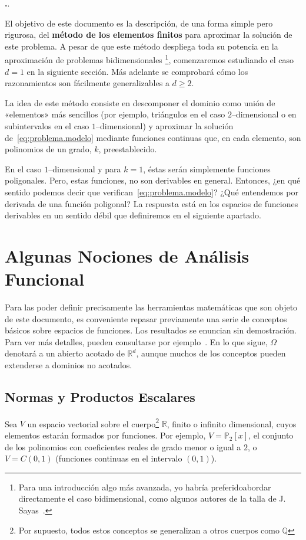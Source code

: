 \documentclass[11pt]{article}
\theoremstyle{plain}
\theoremstyle{definition}
\newcounter{stepnum}[section]
\newcommand{\step}{\bigskip\noindent\textbf{\thesection.\refstepcounter{stepnum}\thestepnum}.\enspace}
\newcommand{\Q}{\ensuremath{\mathbb{Q}}}
\newcommand{\R}{\ensuremath{\mathbb{R}}}
\renewcommand{\P}{\ensuremath{\mathbb{P}}}
\begin{document}
\step

El objetivo de este documento es la descripción,  de una forma simple pero rigurosa, del \textbf{método de los elementos finitos} para aproximar la solución de este problema. 
A pesar de que este método despliega toda su potencia en la aproximación de problemas bidimensionales%
\footnote{Para una introducción algo más avanzada, yo habría preferidoabordar directamente el caso bidimensional, como algunos autores de la talla de J. Sayas~\cite{sayas2008gentle}.}, %
comenzaremos estudiando el caso $d=1$ en la siguiente sección. Más adelante se comprobará cómo los razonamientos son fácilmente generalizables  a $d\geq 2$.

La idea de este método consiste en descomponer el dominio como unión de «elementos» más sencillos (por ejemplo, triángulos en el caso $2$--dimensional o en subintervalos en el caso $1$--dimensional) y aproximar la solución de~\eqref{eq:problema.modelo} mediante funciones continuas que, en cada elemento, son polinomios de un grado, $k$, preestablecido. 

En el caso $1$--dimensional y para $k=1$, éstas serán simplemente funciones poligonales. Pero, estas funciones, no son derivables en general. Entonces, ¿en qué sentido podemos decir que verifican~\eqref{eq:problema.modelo}? ¿Qué entendemos por derivada de una función poligonal? La respuesta está en los espacios de funciones derivables en un sentido débil que definiremos en el siguiente apartado.

\section{Algunas Nociones de Análisis Funcional}
\label{sec:análisis.funcional}

Para las poder definir precisamente las herramientas matemáticas que son objeto de este documento, es conveniente repasar previamente una serie de conceptos básicos sobre espacios de funciones. Los resultados se enuncian sin demostración. Para ver más detalles, pueden consultarse por ejemplo~\cite{adams2003sobolev, sayas2019variational}. En lo que sigue, $\Omega$ denotará a un abierto acotado de $\R^d$, aunque muchos de los conceptos pueden extenderse a dominios no acotados.

\subsection*{Normas y Productos Escalares}
Sea $V$ un espacio vectorial sobre el cuerpo\footnote{Por supuesto, todos estos conceptos se generalizan a otros cuerpos como $\Q$} $\R$, finito o infinito dimensional, cuyos elementos estarán formados por funciones. Por ejemplo, $V=\P_2[x]$, el conjunto de los polinomios con coeficientes reales de grado menor o igual a $2$, o $V=C(0,1)$ (funciones continuas en el intervalo $(0,1)$). 
\end{document}
